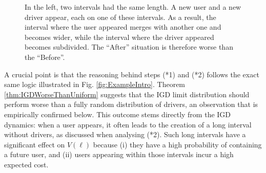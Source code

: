 \documentclass[12pt,english]{article}
\begin{document}
\begin{itemize}
\begin{figure}[ht]
{{


    }
  }
  \caption{In the left, two intervals had the same length. A new user and a new driver appear, each on one of these intervals. As a result, the interval where the user appeared merges with another one and becomes wider, while the interval where the driver appeared becomes subdivided. The ``After'' situation is therefore worse than the ``Before''.}
  \label{fig:OneIntervalMergedTheOtherDivided}
\end{figure}
    
\end{itemize}

A crucial point is that the reasoning behind steps (*1) and (*2) follows the exact same logic illustrated in Fig. \ref{fig:ExampleIntro}. Theorem \ref{thm:IGDWorseThanUniform} suggests that the IGD limit distribution should perform worse than a fully random distribution of drivers, an observation that is empirically confirmed below. This outcome stems directly from the IGD dynamics: when a user appears, it often leads to the creation of a long interval without drivers, as discussed when analysing (*2). Such long intervals have a significant effect on $V(\ell)$ because (i) they have a high probability of containing a future user, and (ii) users appearing within those intervals incur a high expected cost.
\end{document}
